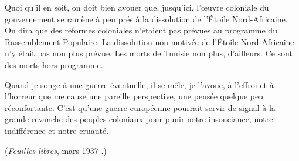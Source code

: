 \documentclass[french,twoside]{book} %
\begin{document}
Quoi qu'il en soit, on doit bien avouer que, jusqu'ici, l'œuvre coloniale du gouvernement se ramène à peu prés à la dissolution de l'Étoile Nord-Africaine. On dira que des réformes coloniales n'étaient pas prévues au programme du Rassemblement Populaire. La dissolution non motivée de l'Étoile Nord-Africaine n'y était pas non plus prévue. Les morts de Tunisie non plus, d'ailleurs. Ce sont des morts hors-programme.\par
Quand je songe à une guerre éventuelle, il se mêle, je l'avoue, à l'effroi et à l'horreur que me cause une pareille perspective, une pensée quelque peu réconfortante. C'est qu'une guerre européenne pourrait servir de signal à la grande revanche des peuples coloniaux pour punir notre insouciance, notre indifférence et notre cruauté.\par
({\itshape Feuilles libres}, mars 1937 .)\par

\begin{center}
\noindent \centerline{}
\end{center}
\end{document}
